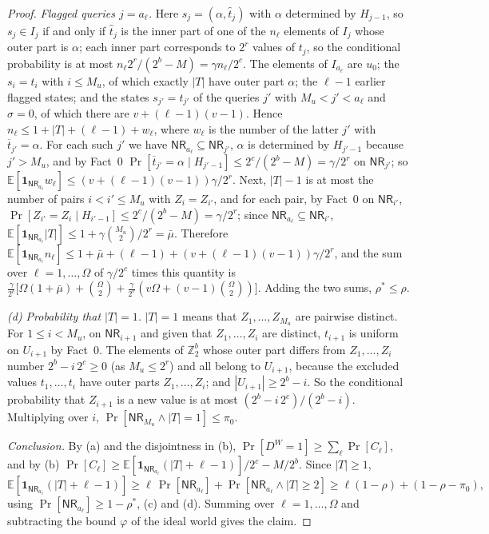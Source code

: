 \documentclass[11pt,a4paper]{article}
\theoremstyle{definition}
\theoremstyle{remark}
\newcommand{\Z}{\mathbb{Z}}
\newcommand{\E}{\mathbb{E}}
\newcommand{\outp}[1]{\overline{#1}}
\newcommand{\inp}[1]{\widehat{#1}}
\newcommand{\NR}{\mathsf{NR}}
\begin{document}
\begin{proof}
\emph{Flagged queries $j = a_\ell$.} Here $s_j = (\alpha, \inp{t}_j)$ with $\alpha$ determined by $H_{j-1}$, so $s_j \in I_j$ if and only
if $\inp{t}_j$ is the inner part of one of the $n_\ell$ elements of $I_j$ whose outer part is $\alpha$; each inner part
corresponds to $2^r$ values of $t_j$, so the conditional probability is at most $n_\ell 2^r/(2^b - M) = \gamma n_\ell/2^c$.
The elements of $I_{a_\ell}$ are $u_0$; the $s_i = t_i$ with $i \le M_u$, of which exactly $|T|$ have outer part $\alpha$;
the $\ell - 1$ earlier flagged states; and the states $s_{j'} = t_{j'}$ of the queries $j'$ with $M_u < j' < a_\ell$ and
$\sigma = 0$, of which there are $v + (\ell-1)(v-1)$. Hence $n_\ell \le 1 + |T| + (\ell - 1) + w_\ell$, where $w_\ell$ is the number of
the latter $j'$ with $\outp{t}_{j'} = \alpha$. For each such $j'$ we have $\NR_{a_\ell} \subseteq \NR_{j'}$, $\alpha$ is determined by
$H_{j'-1}$ because $j' > M_u$, and by Fact~0 $\Pr[\outp{t}_{j'} = \alpha \mid H_{j'-1}] \le 2^c/(2^b - M) = \gamma/2^r$ on $\NR_{j'}$;
so $\E[\mathbf{1}_{\NR_{a_\ell}} w_\ell] \le (v + (\ell-1)(v-1))\gamma/2^r$. Next, $|T| - 1$ is at most the number of pairs
$i < i' \le M_u$ with $Z_i = Z_{i'}$, and for each pair, by Fact~0 on $\NR_{i'}$,
$\Pr[Z_{i'} = Z_i \mid H_{i'-1}] \le 2^c/(2^b - M) = \gamma/2^r$; since $\NR_{a_\ell} \subseteq \NR_{i'}$,
$\E[\mathbf{1}_{\NR_{a_\ell}}|T|] \le 1 + \gamma\binom{M_u}{2}/2^r = \bar\mu$. Therefore
$\E[\mathbf{1}_{\NR_{a_\ell}} n_\ell] \le 1 + \bar\mu + (\ell - 1) + (v + (\ell-1)(v-1))\gamma/2^r$, and the sum over $\ell = 1, \dots, \Omega$ of
$\gamma/2^c$ times this quantity is $\frac{\gamma}{2^c}\bigl[\Omega(1 + \bar\mu) + \binom{\Omega}{2} + \frac{\gamma}{2^r}(v\Omega + (v-1)\binom{\Omega}{2})\bigr]$.
Adding the two sums, $\rho^* \le \rho$.

\emph{(d) Probability that $|T| = 1$.} $|T| = 1$ means that $Z_1, \dots, Z_{M_u}$ are pairwise distinct. For $1 \le i < M_u$, on
$\NR_{i+1}$ and given that $Z_1, \dots, Z_i$ are distinct, $t_{i+1}$ is uniform on $U_{i+1}$ by Fact~0. The elements of
$\Z_2^b$ whose outer part differs from $Z_1, \dots, Z_i$ number $2^b - i\,2^c \ge 0$ (as $M_u \le 2^r$) and all belong to
$U_{i+1}$, because the excluded values $t_1, \dots, t_i$ have outer parts $Z_1, \dots, Z_i$; and $|U_{i+1}| \ge 2^b - i$. So the
conditional probability that $Z_{i+1}$ is a new value is at most $(2^b - i\,2^c)/(2^b - i)$. Multiplying over $i$,
$\Pr[\NR_{M_u} \wedge |T| = 1] \le \pi_0$.

\emph{Conclusion.} By (a) and the disjointness in (b), $\Pr[D^W = 1] \ge \sum_\ell \Pr[C_\ell]$, and by (b)
$\Pr[C_\ell] \ge \E[\mathbf{1}_{\NR_{a_\ell}}(|T| + \ell - 1)]/2^c - M/2^b$. Since $|T| \ge 1$,
\[ \E[\mathbf{1}_{\NR_{a_\ell}}(|T| + \ell - 1)] \ge \ell\,\Pr[\NR_{a_\ell}] + \Pr[\NR_{a_\ell} \wedge |T| \ge 2]
 \ge \ell(1 - \rho) + (1 - \rho - \pi_0), \]
using $\Pr[\NR_{a_\ell}] \ge 1 - \rho^*$, (c) and (d). Summing over $\ell = 1, \dots, \Omega$ and subtracting the bound
$\varphi$ of the ideal world gives the claim.
\end{proof}
\end{document}
